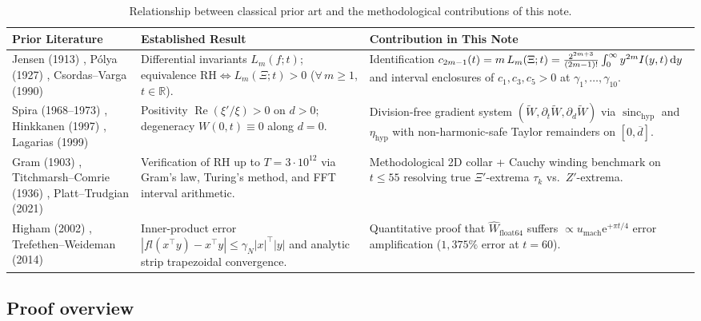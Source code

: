 \documentclass[11pt,a4paper,reqno]{amsart}
\theoremstyle{definition}
\theoremstyle{remark}
\numberwithin{equation}{section}
\newcommand{\dd}{\mathrm{d}}
\newcommand{\ee}{\mathrm{e}}
\newcommand{\Rea}{\operatorname{Re}}
\newcommand{\Wtil}{\widetilde{W}}
\newcommand{\What}{\widehat{W}}
\newcommand{\sinch}{\operatorname{sinc}_{\mathrm{hyp}}}
\newcommand{\etah}{\eta_{\mathrm{hyp}}}
\newcommand{\fac}{\mathclose{\mathchar"0021}}
\begin{document}
\begin{table}[htbp]
\centering
\caption{Relationship between classical prior art and the methodological contributions of this note.}\label{tab:literature}
\footnotesize
\begin{tabular}{p{} p{} p{}}
\toprule
\textbf{Prior Literature} & \textbf{Established Result} & \textbf{Contribution in This Note} \\
\midrule
Jensen (1913) \cite{Jensen1913}, P\'olya (1927) \cite{Polya1927}, Csordas--Varga (1990) \cite{CsordasVarga1990} & Differential invariants $L_m(f;t)$; equivalence $\mathrm{RH} \iff L_m(\Xi;t) > 0$ ($\forall\,m \ge 1$, $t \in \mathbb{R}$). & Identification $c_{2m-1}(t) = m\,L_m(\Xi;t) = \frac{2^{2m+3}}{(2m-1)\fac}\int_0^\infty y^{2m}I(y,t)\,\dd y$ and interval enclosures of $c_1, c_3, c_5 > 0$ at $\gamma_1, \dots, \gamma_{10}$. \\
\addlinespace[3pt]
Spira (1968--1973) \cite{Spira1968,Spira1973}, Hinkkanen (1997) \cite{Hinkkanen1997}, Lagarias (1999) \cite{Lagarias1999} & Positivity $\Rea(\xi'/\xi) > 0$ on $d > 0$; degeneracy $W(0,t) \equiv 0$ along $d = 0$. & Division-free gradient system $(\Wtil, \partial_t\Wtil, \partial_d\Wtil)$ via $\sinch$ and $\etah$ with non-harmonic-safe Taylor remainders on $[0, \overline{d}]$. \\
\addlinespace[3pt]
Gram (1903) \cite{Gram1903}, Titchmarsh--Comrie (1936) \cite{TitchmarshComrie1936}, Platt--Trudgian (2021) \cite{PlattTrudgian2021} & Verification of RH up to $T = 3 \cdot 10^{12}$ via Gram's law, Turing's method, and FFT interval arithmetic. & Methodological 2D collar + Cauchy winding benchmark on $t \le 55$ resolving true $\Xi'$-extrema $\tau_k$ vs.\ $Z'$-extrema. \\
\addlinespace[3pt]
Higham (2002) \cite{Higham2002}, Trefethen--Weideman (2014) \cite{TrefethenWeideman2014} & Inner-product error $|fl(x^\top y) - x^\top y| \le \gamma_N |x|^\top|y|$ and analytic strip trapezoidal convergence. & Quantitative proof that $\What_{\mathrm{float64}}$ suffers $\propto u_{\mathrm{mach}}\ee^{+\pi t/4}$ error amplification ($1{,}375\%$ error at $t = 60$). \\
\bottomrule
\end{tabular}
\end{table}

\subsection{Proof overview}\label{subsec:proof_overview}
\end{document}

